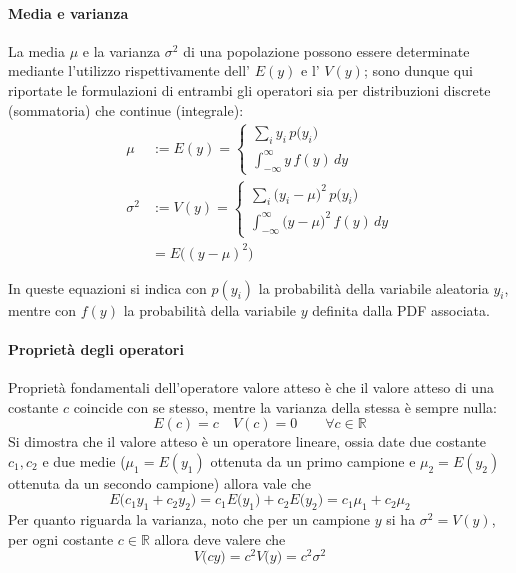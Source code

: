		\paragraph{Media e varianza} La media $\mu$ e la varianza $\sigma^2$ di una popolazione possono essere determinate mediante l'utilizzo rispettivamente dell' $E(y)$ e l' $V(y)$; sono dunque qui riportate le formulazioni di entrambi gli operatori sia per distribuzioni discrete (sommatoria) che continue (integrale):
		\begin{equation}
		\begin{split}
			\mu & := E(y) = \left\{ \begin{split}
				\sum_i y_i \, p\big(y_i\big) \\
				\int_{-\infty}^\infty y\, f(y)\, dy
			\end{split} \right. \\
			\sigma^2 & := V(y) = \left\{ \begin{split}
					\sum_i \big(y_i - \mu\big)^2 \, p\big(y_i\big) \\
					\int_{-\infty}^\infty \big(y -\mu\big)^2\, f(y)\, dy
				\end{split} \right. \\
				&= E\Big( (y-\mu)^2\Big)
		\end{split}
		\end{equation}
		
		In queste equazioni si indica con $p(y_i)$ la probabilità della variabile aleatoria $y_i$, mentre con $f(y)$ la probabilità della variabile $y$ definita dalla PDF associata.
		
		
		\paragraph{Proprietà degli operatori} Proprietà fondamentali dell'operatore valore atteso è che il valore atteso di una costante $c$ coincide con se stesso, mentre la varianza della stessa è sempre nulla:
		\[ E(c) = c  \quad V(c) = 0 \qquad  \forall c \in \mathds R\]
		Si dimostra che il valore atteso è un operatore lineare, ossia date due costante $c_1,c_2$ e due medie ($\mu_1 = E(y_1)$ ottenuta da un primo campione  e $\mu_2 = E(y_2)$ ottenuta da un secondo campione) allora vale che
		\[ E\big(c_1y_1 + c_2 y_2\big) = c_1 E\big(y_1\big) + c_2 E\big(y_2\big) = c_1 \mu_1 + c_2 \mu_2 \]
		Per quanto riguarda la varianza, noto che per un campione $y$ si ha $\sigma^2 = V(y)$, per ogni costante $c\in \mathds R$ allora deve valere che
		\[  V\big(cy\big) = c^2 V\big(y\big) = c^2\sigma^2 \]
		
